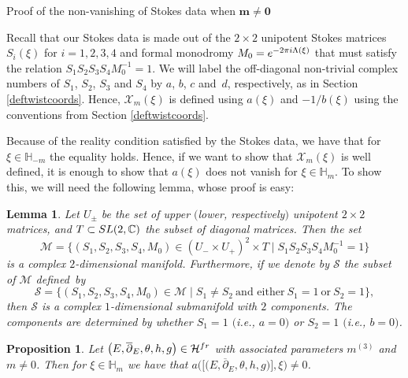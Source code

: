 \documentclass[11pt]{article}
\numberwithin{equation}{section}
\newtheorem{Lemma}[Theorem]{Lemma}
\newtheorem{Proposition}[Theorem]{Proposition}
 { \theoremstyle{definition}
\newtheorem{Definition}[Theorem]{Definition}
\newtheorem{Notation}[Theorem]{Notation}
\newtheorem{Example}[Theorem]{Example}
\newtheorem{Remark}[Theorem]{Remark} }
\numberwithin{equation}{section}
\newcommand{\MC}{\mathcal{X}_m}
\begin{document}
\begin{subsubsection}{Proof of the non-vanishing of Stokes data when $\boldsymbol{m\neq 0}$}

Recall that our Stokes data is made out of the $2\times 2$ unipotent Stokes matrices $S_i(\xi)$ for $i=1,2,3,4$ and formal monodromy $M_0={\rm e}^{-2\pi {\rm i} \Lambda(\xi)}$ that must satisfy the relation $S_1S_2S_3S_4M_0^{-1}=1$. We will label the off-diagonal non-trivial complex numbers of $S_1$, $S_2$, $S_3$ and $S_4$ by $a$, $b$, $c$ and~$d$, respectively, as in Section \ref{deftwistcoords}. Hence, $\MC(\xi)$ is defined using $a(\xi)$ and $-1/b(\xi)$ using the conventions from Section \ref{deftwistcoords}.

Because of the reality condition satisfied by the Stokes data, we have that for $\xi \in \mathbb{H}_{-m}$ the equality  holds. Hence, if we want to show that $\MC(\xi)$ is well defined, it is enough to show that $a(\xi)$ does not vanish for $\xi \in \mathbb{H}_m$. To show this, we will need the following lemma, whose proof is easy:

\begin{Lemma}\label{nvm} Let $U_{\pm}$ be the set of upper $($lower, respectively$)$ unipotent $2\times 2$ matrices, and $T\subset {\rm SL}(2,\mathbb{C})$ the subset of diagonal matrices. Then the set
\begin{equation*}
 \mathcal{M}=\bigl\{(S_1,S_2,S_3,S_4,M_0)\in (U_{-}\times U_{+})^2\times T \mid S_1S_2S_3S_4M_0^{-1}=1\bigr\}
\end{equation*}
is a complex $2$-dimensional manifold. Furthermore, if we denote by $\mathcal{S}$ the subset of $\mathcal{M}$ defined~by
\begin{equation*}
 \mathcal{S}=\{(S_1,S_2,S_3,S_4,M_0) \in \mathcal{M} \mid S_1\neq S_2 \ \text{and either}\ S_1=1 \ \text{or}\ S_2=1\},
\end{equation*}
then $\mathcal{S}$ is a complex $1$-dimensional submanifold with $2$ components. The components are determined by whether $S_1=1$ $($i.e., $a=0)$ or $S_2=1$ $($i.e., $b=0)$.
\end{Lemma}

\begin{Proposition} \label{nonvan}Let $\bigl(E,\overline{\partial}_E,\theta, h, g\bigr)\in \mathcal{H}^{\textnormal{fr}}$ with associated parameters $m^{(3)}$ and $m\neq 0$. Then for $\xi \in \mathbb{H}_m$ we have that $a\bigl(\bigl[\bigl(E,\overline{\partial}_E,\theta, h, g\bigr)\bigr],\xi\bigr)\neq 0$.
\end{Proposition}


\end{subsubsection}
\end{document}
